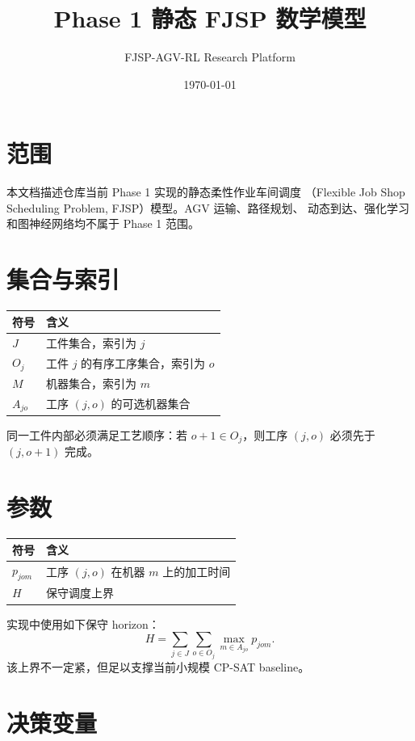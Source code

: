 ﻿\documentclass[11pt]{ctexart}
\title{Phase 1 静态 FJSP 数学模型}
\author{FJSP-AGV-RL Research Platform}
\date{\today}
\begin{document}
\maketitle

\section{范围}

本文档描述仓库当前 Phase 1 实现的静态柔性作业车间调度
（Flexible Job Shop Scheduling Problem, FJSP）模型。AGV 运输、路径规划、
动态到达、强化学习和图神经网络均不属于 Phase 1 范围。

\section{集合与索引}

\begin{table}[h]
\centering
\begin{tabular}{ll}
\toprule
符号 & 含义 \\
\midrule
$J$ & 工件集合，索引为 $j$ \\
$O_j$ & 工件 $j$ 的有序工序集合，索引为 $o$ \\
$M$ & 机器集合，索引为 $m$ \\
$A_{jo}$ & 工序 $(j,o)$ 的可选机器集合 \\
\bottomrule
\end{tabular}
\end{table}

同一工件内部必须满足工艺顺序：若 $o+1 \in O_j$，则工序 $(j,o)$ 必须先于
$(j,o+1)$ 完成。

\section{参数}

\begin{table}[h]
\centering
\begin{tabular}{ll}
\toprule
符号 & 含义 \\
\midrule
$p_{jom}$ & 工序 $(j,o)$ 在机器 $m$ 上的加工时间 \\
$H$ & 保守调度上界 \\
\bottomrule
\end{tabular}
\end{table}

实现中使用如下保守 horizon：
\[
H = \sum_{j \in J} \sum_{o \in O_j} \max_{m \in A_{jo}} p_{jom}.
\]
该上界不一定紧，但足以支撑当前小规模 CP-SAT baseline。

\section{决策变量}
\end{document}
